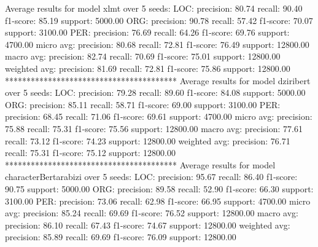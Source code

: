 Average results for model xlmt over 5 seeds:
  LOC:
    precision: 80.74
    recall: 90.40
    f1-score: 85.19
    support: 5000.00
  ORG:
    precision: 90.78
    recall: 57.42
    f1-score: 70.07
    support: 3100.00
  PER:
    precision: 76.69
    recall: 64.26
    f1-score: 69.76
    support: 4700.00
  micro avg:
    precision: 80.68
    recall: 72.81
    f1-score: 76.49
    support: 12800.00
  macro avg:
    precision: 82.74
    recall: 70.69
    f1-score: 75.01
    support: 12800.00
  weighted avg:
    precision: 81.69
    recall: 72.81
    f1-score: 75.86
    support: 12800.00
****************************************
Average results for model dziribert over 5 seeds:
  LOC:
    precision: 79.28
    recall: 89.60
    f1-score: 84.08
    support: 5000.00
  ORG:
    precision: 85.11
    recall: 58.71
    f1-score: 69.00
    support: 3100.00
  PER:
    precision: 68.45
    recall: 71.06
    f1-score: 69.61
    support: 4700.00
  micro avg:
    precision: 75.88
    recall: 75.31
    f1-score: 75.56
    support: 12800.00
  macro avg:
    precision: 77.61
    recall: 73.12
    f1-score: 74.23
    support: 12800.00
  weighted avg:
    precision: 76.71
    recall: 75.31
    f1-score: 75.12
    support: 12800.00
****************************************
Average results for model characterBertarabizi over 5 seeds:
  LOC:
    precision: 95.67
    recall: 86.40
    f1-score: 90.75
    support: 5000.00
  ORG:
    precision: 89.58
    recall: 52.90
    f1-score: 66.30
    support: 3100.00
  PER:
    precision: 73.06
    recall: 62.98
    f1-score: 66.95
    support: 4700.00
  micro avg:
    precision: 85.24
    recall: 69.69
    f1-score: 76.52
    support: 12800.00
  macro avg:
    precision: 86.10
    recall: 67.43
    f1-score: 74.67
    support: 12800.00
  weighted avg:
    precision: 85.89
    recall: 69.69
    f1-score: 76.09
    support: 12800.00



